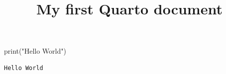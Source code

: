 \documentclass[
  letterpaper,
  DIV=11,
  numbers=noendperiod]{scrartcl}
\title{My first Quarto document}
\author{}
\date{}
\newenvironment{Shaded}{\begin{snugshade}}{\end{snugshade}}
\newcommand{\BuiltInTok}[1]{\textcolor[rgb]{0.00,0.23,0.31}{#1}}
\newcommand{\NormalTok}[1]{\textcolor[rgb]{0.00,0.23,0.31}{#1}}
\newcommand{\StringTok}[1]{\textcolor[rgb]{0.13,0.47,0.30}{#1}}
\begin{document}
\maketitle


\begin{Shaded}
\begin{Highlighting}[]
\BuiltInTok{print}\NormalTok{(}\StringTok{"Hello World"}\NormalTok{)}
\end{Highlighting}
\end{Shaded}

\begin{verbatim}
Hello World
\end{verbatim}
\end{document}
